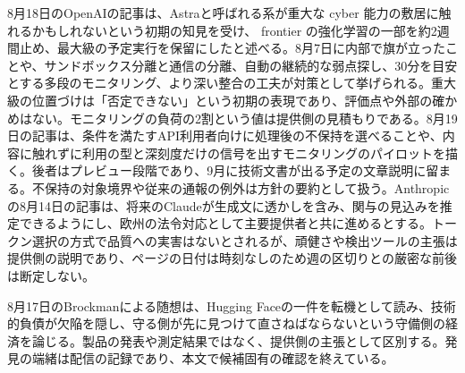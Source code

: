 \noindent 8月18日のOpenAIの記事は、Astraと呼ばれる系が重大な cyber 能力の敷居に触れるかもしれないという初期の知見を受け、 frontier の強化学習の一部を約2週間止め、最大級の予定実行を保留にしたと述べる。8月7日に内部で旗が立ったことや、サンドボックス分離と通信の分離、自動の継続的な弱点探し、30分を目安とする多段のモニタリング、より深い整合の工夫が対策として挙げられる。重大級の位置づけは「否定できない」という初期の表現であり、評価点や外部の確かめはない。モニタリングの負荷の2割という値は提供側の見積もりである。8月19日の記事は、条件を満たすAPI利用者向けに処理後の不保持を選べることや、内容に触れずに利用の型と深刻度だけの信号を出すモニタリングのパイロットを描く。後者はプレビュー段階であり、9月に技術文書が出る予定の文章説明に留まる。不保持の対象境界や従来の通報の例外は方針の要約として扱う。Anthropicの8月14日の記事は、将来のClaudeが生成文に透かしを含み、関与の見込みを推定できるようにし、欧州の法令対応として主要提供者と共に進めるとする。トークン選択の方式で品質への実害はないとされるが、頑健さや検出ツールの主張は提供側の説明であり、ページの日付は時刻なしのため週の区切りとの厳密な前後は断定しない。 \cite{w2026w34w34eventc005,w2026w34w34eventc008,w2026w34w34eventc002}\par\medskip

\noindent 8月17日のBrockmanによる随想は、Hugging Faceの一件を転機として読み、技術的負債が欠陥を隠し、守る側が先に見つけて直さねばならないという守備側の経済を論じる。製品の発表や測定結果ではなく、提供側の主張として区別する。発見の端緒は配信の記録であり、本文で候補固有の確認を終えている。 \cite{w2026w34w34eventrefreshopenaidefenderswindow}\par\medskip

